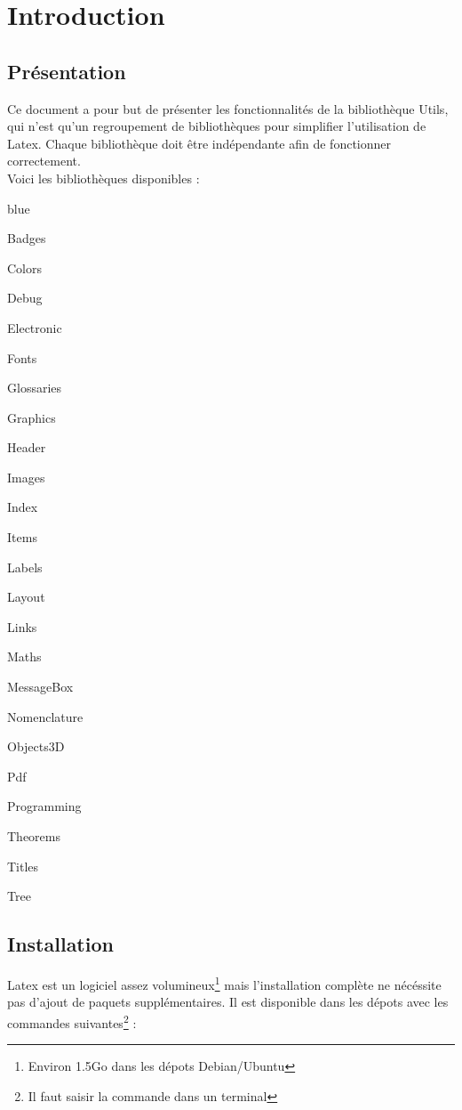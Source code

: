 \chapter{Introduction}

\section{Présentation}
Ce document a pour but de présenter les fonctionnalités de la bibliothèque Utils, qui n'est qu'un regroupement de bibliothèques pour simplifier l'utilisation de Latex. \n
Chaque bibliothèque doit être indépendante afin de fonctionner correctement.\\

Voici les bibliothèques disponibles : 

\begin{items}{blue}{\Circle}
\item Badges
\item Colors
\item Debug
\item Electronic
\item Fonts
\item Glossaries
\item Graphics
\item Header
\item Images
\item Index
\item Items
\item Labels
\item Layout
\item Links
\item Maths
\item MessageBox
\item Nomenclature
\item Objects3D
\item Pdf
\item Programming
\item Theorems
\item Titles
\item Tree
\end{items}

\section{Installation}

Latex est un logiciel assez volumineux\footnote{Environ 1.5Go dans les dépots Debian/Ubuntu} mais l'installation complète ne nécéssite pas d'ajout de paquets supplémentaires.
Il est disponible dans les dépots  avec les commandes suivantes\footnote{Il faut saisir la commande dans un terminal} :\\

